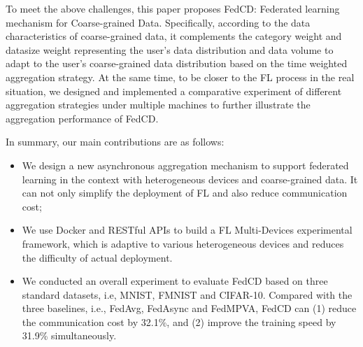 \documentclass[twoside,twocolumn]{article}
\begin{document}
	To meet the above challenges, this paper proposes FedCD: Federated learning mechanism for Coarse-grained Data. Specifically, according to the data characteristics of coarse-grained data,  it complements the category weight and datasize weight representing the user's data distribution and data volume to adapt to the user's coarse-grained data distribution based on the time weighted aggregation strategy. At the same time, to be closer to the FL process in the real situation, we designed and implemented a comparative experiment of different aggregation strategies under multiple machines to further illustrate the aggregation performance of FedCD.
		
	In summary, our main contributions are as follows: 
	
	
	
	\begin{itemize}
	\item We design a new asynchronous aggregation mechanism to support federated learning in the context with heterogeneous devices and coarse-grained data. It can not only simplify the deployment of FL and also reduce communication cost;
	\item We use Docker and RESTful APIs to build a FL Multi-Devices experimental framework, which is adaptive to various heterogeneous devices and reduces the difficulty of actual deployment.
	\item We conducted an overall experiment to evaluate FedCD based on three standard datasets, i.e, MNIST, FMNIST and CIFAR-10. Compared with the three baselines, i.e.,  FedAvg, FedAsync and FedMPVA, FedCD can (1) reduce the communication cost by 32.1\%, and (2) improve the training speed by 31.9\% simultaneously.
	\end{itemize}
	
\end{document}
